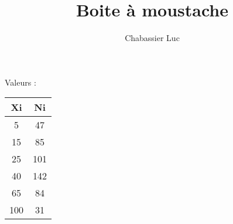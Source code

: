 \documentclass{article}
\title{Boite à moustache}
\author{Chabassier Luc}
\begin{document}
\maketitle

Valeurs : \\
\begin{center}
	\begin{tabular}{|c|c|}
		\hline
		\textbf{Xi} & \textbf{Ni} \\
		\hline
		5 & 47 \\
		\hline
		15 & 85 \\
		\hline
		25 & 101 \\
		\hline
		40 & 142 \\
		\hline
		65 & 84 \\
		\hline
		100 & 31 \\
		\hline
	\end{tabular}
\end{center}
\end{document}

